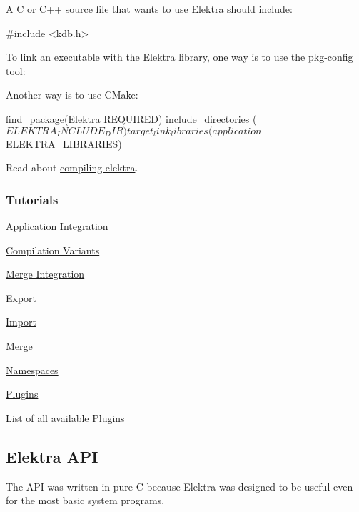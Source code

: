 A C or C++ source file that wants to use Elektra should include\+: \begin{DoxyVerb}    #include <kdb.h>
\end{DoxyVerb}


To link an executable with the Elektra library, one way is to use the {\ttfamily pkg-\/config} tool\+: 


Another way is to use C\+Make\+: \begin{DoxyVerb}    find_package(Elektra REQUIRED)
    include_directories (${ELEKTRA_INCLUDE_DIR})
    target_link_libraries (application ${ELEKTRA_LIBRARIES})
\end{DoxyVerb}


Read about \hyperlink{doc_COMPILE_md}{compiling elektra}.

\subsubsection*{Tutorials}


\begin{DoxyItemize}
\item \hyperlink{doc_tutorials_application-integration_md}{Application Integration}
\item \hyperlink{doc_tutorials_compilation-variants_md}{Compilation Variants}
\item \hyperlink{doc_tutorials_elektra-merge-integration_md}{Merge Integration}
\item \hyperlink{doc_tutorials_export_md}{Export}
\item \hyperlink{doc_tutorials_import_md}{Import}
\item \hyperlink{doc_tutorials_merge_md}{Merge}
\item \hyperlink{doc_tutorials_namespaces_md}{Namespaces}
\item \hyperlink{doc_tutorials_plugins_md}{Plugins}
\end{DoxyItemize}

\hyperlink{md_src_plugins_README_src_plugins_README_md}{List of all available Plugins}

\subsection*{Elektra A\+P\+I}

The A\+P\+I was written in pure C because Elektra was designed to be useful even for the most basic system programs.

